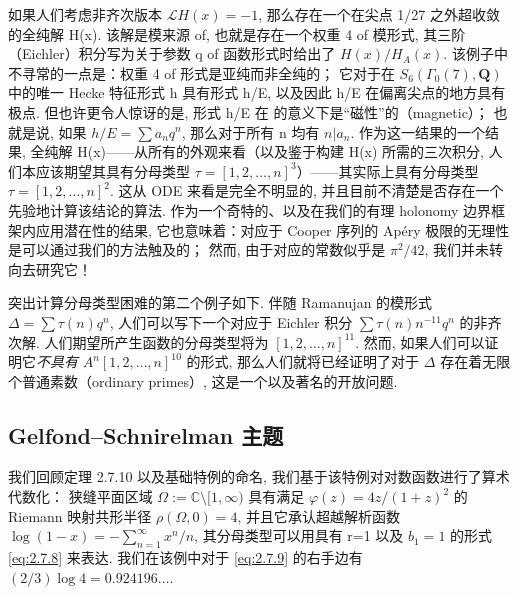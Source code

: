 如果人们考虑非齐次版本 \(\mathcal{L}H(x) = -1\), 
那么存在一个在尖点 1/27 之外超收敛的全纯解 H(x). 
该解是模来源 of, 
也就是存在一个权重 4 of 模形式, 
其三阶（Eichler）积分写为关于参数 q of 函数形式时给出了 \(H(x)/H_A(x)\). 
该例子中不寻常的一点是：权重 4 of 形式是亚纯而非全纯的； 
它对于在 \(S_6(\Gamma_0(7), \mathbf{Q})\) 中的唯一 Hecke 特征形式 h 具有形式 h/E, 
以及因此 h/E 在偏离尖点的地方具有极点. 
但也许更令人惊讶的是, 形式 h/E 在 \cite{BZ19} 的意义下是“磁性”的（magnetic）； 
也就是说, 如果 \(h/E = \sum a_n q^n\), 
那么对于所有 n 均有 \(n|a_n\). 
作为这一结果的一个结果, 
全纯解 H(x)——从所有的外观来看（以及鉴于构建 H(x) 所需的三次积分, 人们本应该期望其具有分母类型 \(\tau = [1, 2, \dots, n]^3\)）——其实际上具有分母类型 \(\tau = [1, 2, \dots, n]^2\). 
这从 ODE 来看是完全不明显的, 
并且目前不清楚是否存在一个先验地计算该结论的算法. 
作为一个奇特的、以及在我们的有理 holonomy 边界框架内应用潜在性的结果, 它也意味着：对应于 Cooper 序列的 Ap{\'e}ry 极限的无理性是可以通过我们的方法触及的； 
然而, 由于对应的常数似乎是 \(\pi^2/42\), 我们并未转向去研究它！

突出计算分母类型困难的第二个例子如下. 
伴随 Ramanujan 的模形式 \(\Delta = \sum \tau(n)q^n\), 
人们可以写下一个对应于 Eichler 积分 \(\sum \tau(n)n^{-11}q^n\) 的非齐次解. 
人们期望所产生函数的分母类型将为 \([1,2,\ldots,n]^{11}\). 
然而, 如果人们可以证明它\textit{不具有} \(A^n[1,2,\ldots,n]^{10}\) 的形式, 
那么人们就将已经证明了对于 \(\Delta\) 存在着无限个普通素数（ordinary primes）, 
这是一个以及著名的开放问题.

\subsection{Gelfond--Schnirelman 主题}\label{sec:15.6}

我们回顾定理 2.7.10 以及基础特例的命名, 
我们基于该特例对对数函数进行了算术代数化： 
狭缝平面区域 \(\Omega := \mathbb{C} \setminus [1, \infty)\) 
具有满足 \(\varphi(z) = 4z/(1+z)^2\) 的 Riemann 映射共形半径 \(\rho(\Omega, 0) = 4\), 
并且它承认超越解析函数 \(\log(1-x) = -\sum_{n=1}^{\infty} x^n/n\), 
其分母类型可以用具有 r=1 以及 \(b_1 = 1\) 的形式 \eqref{eq:2.7.8} 来表达. 
我们在该例中对于 \eqref{eq:2.7.9} 的右手边有 \((2/3) \log 4 = 0.924196 \dots\).

